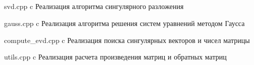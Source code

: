 \begin{appendices}
	\chapter{}
	{svd.cpp} %
	{c} %
	{Реализация алгоритма сингулярного разложения} %
	
	{gauss.cpp} %
	{c} %
	{Реализация алгоритма решения систем уравнений методом Гаусса} %
	
	{compute_evd.cpp} %
	{c} %
	{Реализация поиска сингулярных векторов и чисел матрицы} %
	
	{utils.cpp} %
	{c} %
	{Реализация расчета произведения матриц и обратных матриц} %
	
	
	
	
\end{appendices}
	
	
	
